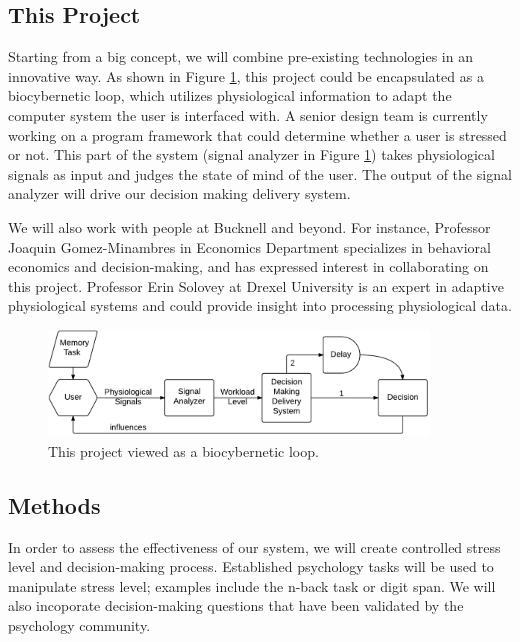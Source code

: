 \documentclass[12pt]{article}
\begin{document}
\subsection{This Project}\label{this-project}


Starting from a big concept, we will combine pre-existing technologies in an innovative way. As shown in Figure \ref{figure:mindmap}, this project could be encapsulated as a biocybernetic loop, which utilizes physiological information to adapt the computer system the user is interfaced with. A senior design team is currently working on a program framework that could determine whether a user is stressed or not. This part of the system (signal analyzer in Figure \ref{figure:mindmap}) takes physiological signals as input and judges the state of mind of the user. The output of the signal analyzer will drive our decision making delivery system.

We will also work with people at Bucknell and beyond. For instance, Professor Joaquin Gomez-Minambres in Economics Department specializes in behavioral economics and decision-making, and has expressed interest in collaborating on this project. Professor Erin Solovey at Drexel University is an expert in adaptive physiological systems and could provide insight into processing physiological data.

\begin{figure}[h]
\centering
\includegraphics[width=0.9\textwidth]{hci_mindmap.pdf}
\caption{This project viewed as a biocybernetic loop.}
\label{figure:mindmap}
\end{figure}




\subsection{Methods}\label{methods}


In order to assess the effectiveness of our system, we will create controlled stress level and decision-making process. Established psychology tasks will be used to manipulate stress level; examples include the n-back task or digit span. We will also incoporate decision-making questions that have been validated by the psychology community. 
\end{document}

